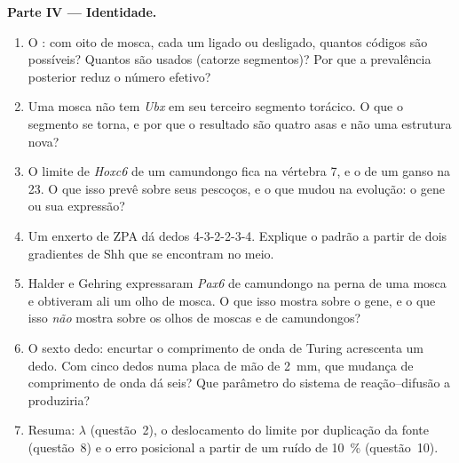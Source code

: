 \begin{problem}
\medskip
\noindent\textbf{Parte IV --- Identidade.}
\begin{enumerate}[resume]
  \item O : com oito  de mosca, cada um ligado ou
        desligado, quantos códigos são possíveis? Quantos são usados
        (catorze segmentos)? Por que a prevalência posterior reduz o
        número efetivo?
  \item Uma mosca não tem \emph{Ubx} em seu terceiro segmento torácico. O
        que o segmento se torna, e por que o resultado são quatro asas e
        não uma estrutura nova?
  \item O limite de \emph{Hoxc6} de um camundongo fica na vértebra 7, e o
        de um ganso na 23. O que isso prevê sobre seus pescoços, e o que
        mudou na evolução: o gene ou sua expressão?
  \item Um enxerto de ZPA dá dedos 4-3-2-2-3-4. Explique o padrão a
        partir de dois gradientes de Shh que se encontram no meio.
  \item Halder e Gehring expressaram \emph{Pax6} de camundongo na perna
        de uma mosca e obtiveram ali um olho de mosca. O que isso mostra
        sobre o gene, e o que isso \emph{não} mostra sobre os olhos de
        moscas e de camundongos?
  \item O sexto dedo: encurtar o comprimento de onda de Turing acrescenta
        um dedo. Com cinco dedos numa placa de mão de \qty{2}{mm}, que
        mudança de comprimento de onda dá seis? Que parâmetro do sistema
        de reação--difusão a produziria?
  \item Resuma: $\lambda$ (questão~2), o deslocamento do limite por
        duplicação da fonte (questão~8) e o erro posicional a partir de
        um ruído de \qty{10}{\%} (questão~10).
\end{enumerate}
\end{problem}
